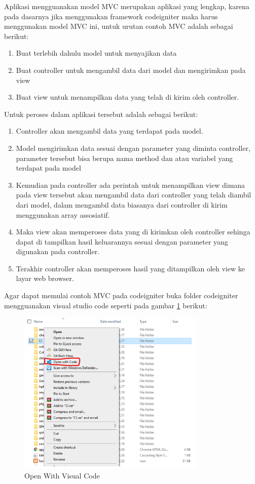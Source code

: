 Aplikasi mengguanakan model MVC merupakan aplikasi yang lengkap, karena pada dasarnya jika menggunakan framework codeigniter maka harus menggunakan model MVC ini, untuk urutan contoh MVC adalah sebagai berikut:
\begin{enumerate}
\item Buat terlebih dahulu model untuk menyajikan data 
\item Buat controller untuk mengambil data dari model dan mengirimkan pada view 
\item Buat view untuk menampilkan data yang telah di kirim oleh controller.
\end{enumerate}
Untuk peroses dalam aplikasi tersebut adalah sebagai berikut:
\begin{enumerate}
\item Controller akan mengambil data yang terdapat pada model.
\item Model mengirimkan data sesuai dengan parameter yang diminta controller, parameter tersebut bisa berupa nama method dan atau variabel yang terdapat pada model
\item Kemudian pada controller ada perintah untuk menampilkan view dimana pada view tersebut akan mengambil data dari controller yang telah diambil dari model, dalam mengambil data biasanya dari controller di kirim menggunakan array assosiatif.
\item Maka view akan memperoses data yang di kirimkan oleh controller sehinga dapat di tampilkan hasil keluarannya sesuai dengan parameter yang digunakan pada controller.
\item Terakhir controller akan memperoses hasil yang ditampilkan oleh view ke layar web browser.
\end{enumerate}
Agar dapat memulai contoh MVC pada codeigniter buka folder codeigniter mengguanakan visual studio code seperti pada gambar \ref{mvc1} berikut:

\begin{figure}[!htbp]
	\centerline{\includegraphics[width=0.80\textwidth]{figures/MVC/1.png}}
	\caption{Open With Visual Code}
	\label{mvc1}
\end{figure}
\pagebreak

